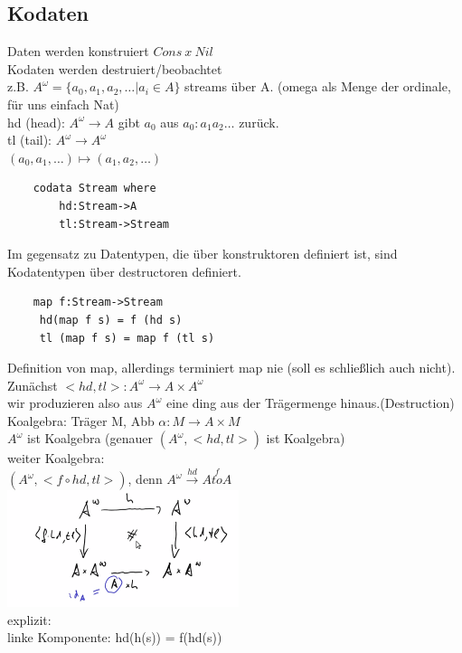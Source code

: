 \documentclass{article}
\theoremstyle{definition}
\begin{document}
	\subsection{Kodaten}
	Daten werden konstruiert $Cons\ x\ Nil$\\
	Kodaten werden destruiert/beobachtet\\
	z.B. $A^\omega=\{a_0,a_1,a_2,\dots|a_i\in A\}$ streams über A. (omega als Menge der ordinale, für uns einfach Nat)\\
	hd (head): $A^\omega\to A$ gibt $a_0$ aus $a_0:a_1a_2\dots$ zurück.\\
	tl (tail): $A^\omega\to A^\omega$\\
	$(a_0,a_1,\dots)\mapsto (a_1,a_2,\dots)$\\
	\begin{verbatim}
	codata Stream where
		hd:Stream->A
		tl:Stream->Stream
	\end{verbatim}
	Im gegensatz zu Datentypen, die über konstruktoren definiert ist, sind Kodatentypen über destructoren definiert.\\
	\begin{verbatim}
	map f:Stream->Stream
	 hd(map f s) = f (hd s)
	 tl (map f s) = map f (tl s)
	\end{verbatim}
	Definition von map, allerdings terminiert map nie (soll es schließlich auch nicht).\\
	Zunächst $<hd,tl>:A^\omega\to A\times A^\omega$\\
	wir produzieren also aus $A^\omega$ eine ding aus der Trägermenge hinaus.(Destruction)\\
	Koalgebra: Träger M, Abb $\alpha:M\to A\times M$\\
	$A^\omega$ ist Koalgebra (genauer $(A^\omega,<hd,tl>)$ ist Koalgebra)\\
	weiter Koalgebra:\\
	$(A^\omega,<f\circ hd,tl>)$, denn $A^\omega\stackrel{hd}{\to}A\stackrel{f}{to}A$\\
	\includegraphics[width=256px]{images/CoalgebraHomomorph.png}\\
	explizit:\\
	linke Komponente: hd(h(s)) = f(hd(s))\\
\end{document}
